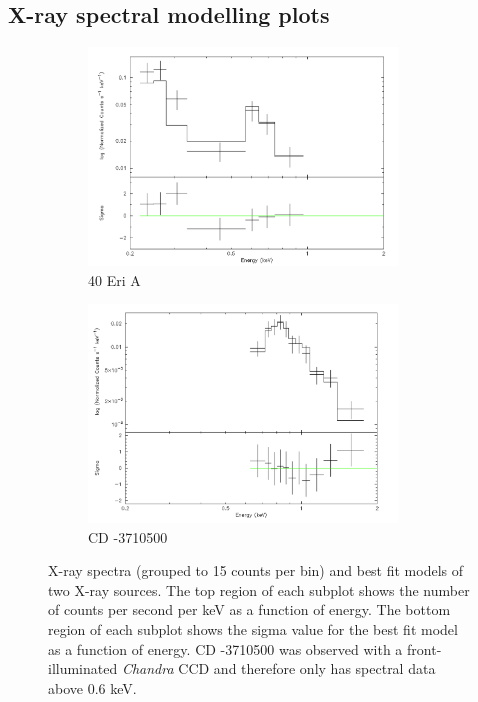 \begin{appendices}
\chapter{X-ray spectral modelling plots}
\label{Appendix_Xray_spectra}
\begin{figure}[h]
\begin{subfigure}{\textwidth}
	\centering
	\includegraphics[height = 0.23\paperheight,width=0.9\textwidth]{Figures/3-Xray_age/spec_40eria}
	\caption{40 Eri A}
\end{subfigure}
\begin{subfigure}{\textwidth}
	\centering
	\includegraphics[height = 0.23\paperheight,width=0.9\textwidth]{Figures/3-Xray_age/spec_cd-3710500}
	\caption{CD -3710500}
\end{subfigure}

\caption[X-ray spectra of 40 Eri A and CD -3710500]{X-ray spectra (grouped to 15 counts per bin) and best fit models of two X-ray sources. The top region of each subplot shows the number of counts per second per keV as a function of energy. The bottom region of each subplot shows the sigma value for the best fit model as a function of energy. CD -3710500 was observed with a front-illuminated \textit{Chandra} CCD and therefore only has spectral data above 0.6 keV.}
\label{App_A_40EriA_CD3710500}
\end{figure}


\end{appendices}
